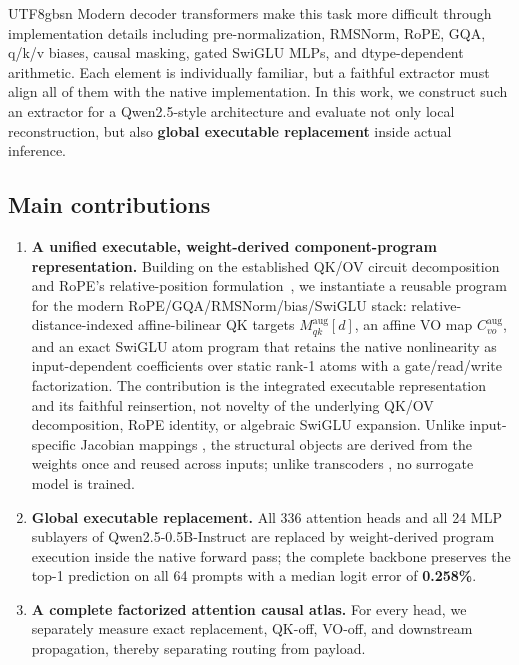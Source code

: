 \documentclass[11pt]{article}
\begin{document}
\begin{CJK*}{UTF8}{gbsn}
Modern decoder transformers make this task more difficult through
implementation details including pre-normalization, RMSNorm, RoPE, GQA,
q/k/v biases, causal masking, gated SwiGLU MLPs, and dtype-dependent
arithmetic. Each element is individually familiar, but a faithful
extractor must align all of them with the native implementation. In this
work, we construct such an extractor for a Qwen2.5-style architecture
and evaluate not only local reconstruction, but also \textbf{global
executable replacement} inside actual inference.

\subsection{Main contributions}

\begin{enumerate}
\def\labelenumi{\arabic{enumi}.}
\item
  \textbf{A unified executable, weight-derived component-program representation.}
  Building on the established QK/OV circuit decomposition and RoPE's
  relative-position formulation~\citep{elhage2021framework,su2021roformer},
  we instantiate a reusable program for the modern
  RoPE/GQA/RMSNorm/bias/SwiGLU stack: relative-distance-indexed
  affine-bilinear QK targets $M^{\mathrm{aug}}_{qk}[d]$, an affine VO map
  $C^{\mathrm{aug}}_{vo}$, and an exact SwiGLU atom program that retains
  the native nonlinearity as input-dependent coefficients over static
  rank-1 atoms with a gate/read/write factorization. The contribution is
  the integrated executable representation and its faithful reinsertion,
  not novelty of the underlying QK/OV decomposition, RoPE identity, or
  algebraic SwiGLU expansion. Unlike input-specific Jacobian mappings
  \citep{golden2025locally}, the structural objects are derived from the
  weights once and reused across inputs; unlike transcoders
  \citep{dunefsky2024transcoders}, no surrogate model is trained.
\item
  \textbf{Global executable replacement.} All 336 attention heads and
  all 24 MLP sublayers of Qwen2.5-0.5B-Instruct are replaced by
  weight-derived program execution inside the native forward pass; the
  complete backbone preserves the top-1 prediction on all 64 prompts
  with a median logit error of \textbf{0.258\%}.
\item
  \textbf{A complete factorized attention causal atlas.} For every head,
  we separately measure exact replacement, QK-off, VO-off, and
  downstream propagation, thereby separating routing from payload.

\end{enumerate}
\end{CJK*}
\end{document}
